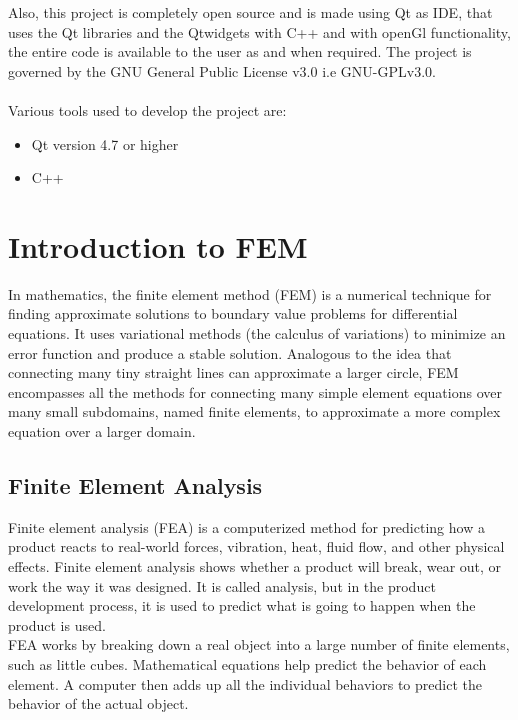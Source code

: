 \hspace{-1.8em} Also, this project is completely open source and is made using Qt as IDE, that uses the Qt libraries 
and the Qtwidgets with C++ and with openGl functionality, the entire code is available to the user as and when required.
The project is governed by the GNU General Public License v3.0 i.e GNU-GPLv3.0.\\\\
Various tools used to develop the project are:\\
\begin{itemize}
\item Qt version 4.7 or higher
\item C++
\end{itemize}

\section{Introduction to FEM}
In mathematics, the finite element method (FEM) is a numerical technique for finding approximate solutions to boundary value problems for differential equations. It uses variational methods (the calculus of variations) to minimize an error function and produce a stable solution. Analogous to the idea that connecting many tiny straight lines can approximate a larger circle, FEM encompasses all the methods for connecting many simple element equations over many small subdomains, named finite elements, to approximate a more complex equation over a larger domain.
\subsection{Finite Element Analysis}
Finite element analysis (FEA) is a computerized method for predicting how a product reacts to real-world forces, vibration, heat, fluid flow, and other physical effects. Finite element analysis shows whether a product will break, wear out, or work the way it was designed. It is called analysis, but in the product development process, it is used to predict what is going to happen when the product is used.\\
FEA works by breaking down a real object into a large number of finite elements, such as little cubes. Mathematical equations help predict the behavior of each element. A computer then adds up all the individual behaviors to predict the behavior of the actual object.\\
